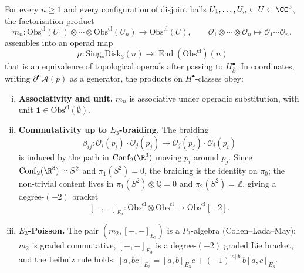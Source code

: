 \begin{theorem}
\label{thm:E3-action-6d-hCS}
For every $n\geq 1$ and every configuration of disjoint balls
$U_1,\dots,U_n\subset U\subset\CC^3$, the factorisation product
\[
m_n\colon
\mathrm{Obs}^{\mathrm{cl}}(U_1)\otimes\cdots\otimes \mathrm{Obs}^{\mathrm{cl}}(U_n)
\longrightarrow
\mathrm{Obs}^{\mathrm{cl}}(U),
\qquad
\mathcal{O}_1\otimes\cdots\otimes\mathcal{O}_n\mapsto \mathcal{O}_1\cdots\mathcal{O}_n,
\]
assembles into an operad map
\[
\mu\colon
\mathrm{Sing}_*\mathrm{Disk}_3(n)
\longrightarrow
\operatorname{End}(\mathrm{Obs}^{\mathrm{cl}})(n)
\]
that is an equivalence of topological operads after passing to
$H^\bullet_{\bar\partial}$. In coordinates, writing
$\partial^{\mathbf{n}}\mathcal{A}(p)$ as a generator, the products on
$H^\bullet$-classes obey:
\begin{enumerate}[(i)]
\item \textbf{Associativity and unit.} $m_n$ is associative under
operadic substitution, with unit $\mathbf{1}\in \mathrm{Obs}^{\mathrm{cl}}(\emptyset)$.
\item \textbf{Commutativity up to $E_3$-braiding.} The braiding
\[
\beta_{ij}\colon
\mathcal{O}_i(p_i)\cdot \mathcal{O}_j(p_j)\longmapsto
\mathcal{O}_j(p_j)\cdot \mathcal{O}_i(p_i)
\]
is induced by the path in $\mathrm{Conf}_2(\R^3)$ moving $p_i$ around
$p_j$. Since $\mathrm{Conf}_2(\R^3)\simeq S^2$ and $\pi_1(S^2)=0$, the
braiding is the identity on $\pi_0$; the non-trivial content lives in
$\pi_1(S^2)\otimes \mathbb{Q} = 0$ and $\pi_2(S^2)=\mathbb{Z}$, giving
a degree-$(-2)$ bracket
\[
[-,-]_{E_3}\colon
\mathrm{Obs}^{\mathrm{cl}}\otimes \mathrm{Obs}^{\mathrm{cl}}\to \mathrm{Obs}^{\mathrm{cl}}[-2].
\]
\item \textbf{$E_3$-Poisson.} The pair
$(m_2, [-,-]_{E_3})$ is a $P_3$-algebra (Cohen--Lada--May): $m_2$ is
graded commutative, $[-,-]_{E_3}$ is a degree-$(-2)$ graded Lie
bracket, and the Leibniz rule holds:
$[a, bc]_{E_3} = [a,b]_{E_3}c + (-1)^{|a||b|} b[a,c]_{E_3}$.
\end{enumerate}
\end{theorem}

